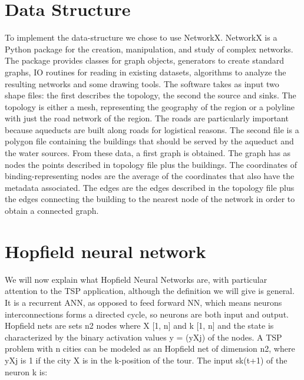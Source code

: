 \section{Data Structure}
\label{data_structure_technical}
To implement the data-structure we chose to use NetworkX. NetworkX is a Python package
for the creation, manipulation, and study of complex networks. The package provides
classes for graph objects, generators to create standard graphs, IO routines for reading in
existing datasets, algorithms to analyze the resulting networks and some drawing tools.
The software takes as input two shape files: the first describes the topology, the second
the source and sinks. The topology is either a mesh, representing the geography of the
region or a polyline with just the road network of the region. The roads are particularly
important because aqueducts are built along roads for logistical reasons. The second file
is a polygon file containing the buildings that should be served by the aqueduct and the
water sources.
From these data, a first graph is obtained. The graph has as nodes the points described
in topology file plus the buildings. The coordinates of binding-representing nodes are the
average of the coordinates that also have the metadata associated. The edges are the edges
described in the topology file plus the edges connecting the building to the nearest node
of the network in order to obtain a connected graph.

\section {Hopfield neural network}
\label{Hnn}

We will now explain what Hopfield Neural Networks are, with particular attention to the TSP application,
although the definition we will give is general.
It is a recurrent ANN, as opposed to feed forward NN, which means neurons interconnections forms a 
directed cycle, so neurons are both input and output. 
Hopfield nets are sets n2 nodes where X [1, n] and k  [1, n] and the state is characterized by the 
binary activation values y = (yXj) of the nodes.
A TSP problem with n cities can be modeled as an Hopfield net of dimension n2, where yXj is 1 if the 
city X is in the k-position of the tour.
\bigbreak
The input sk(t+1) of the neuron k is:


